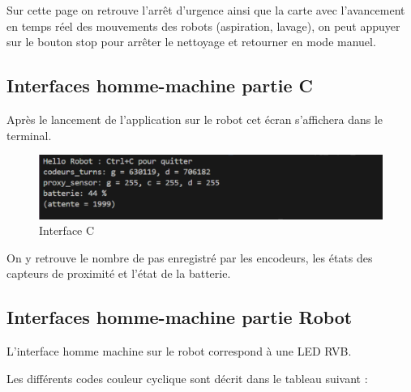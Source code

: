 Sur cette page on retrouve l'arrêt d'urgence ainsi que la carte avec l'avancement en temps réel des mouvements des robots (aspiration, lavage), on peut appuyer sur le bouton stop pour arrêter le nettoyage et retourner en mode manuel. 

\subsection{Interfaces homme-machine partie C}

Après le lancement de l'application sur le robot cet écran s'affichera dans le terminal. 

\begin{figure}[H]
    \centering
    \includegraphics[scale=0.25]{data/IHM6.png}
    \caption{Interface C}
    \label{fig:ihm_c}
\end{figure}

On y retrouve le nombre de pas enregistré par les encodeurs, les états des capteurs de proximité et l'état de la batterie.

\subsection{Interfaces homme-machine partie Robot}

L'interface homme machine sur le robot correspond à une LED RVB. 

Les différents codes couleur cyclique sont décrit dans le tableau suivant : 

